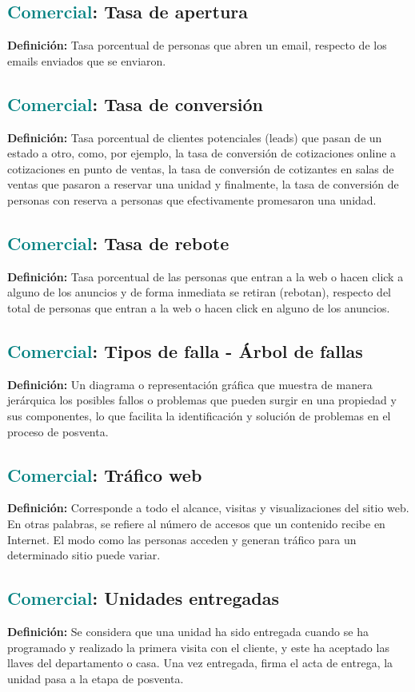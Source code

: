 \documentclass[12pt]{article}
\begin{document}
\subsection{\textcolor{teal}{Comercial}: Tasa de apertura}
\textbf{Definición:} Tasa porcentual de personas que abren un email, respecto de los emails enviados que se enviaron.
\subsection{\textcolor{teal}{Comercial}: Tasa de conversión}
\textbf{Definición:} Tasa porcentual de clientes potenciales (leads) que pasan de un estado a otro, como, por ejemplo, la tasa de conversión de cotizaciones online a cotizaciones en punto de ventas, la tasa de conversión de cotizantes en salas de ventas que pasaron a reservar una unidad y finalmente, la tasa de conversión de personas con reserva a personas que efectivamente promesaron una unidad.
\subsection{\textcolor{teal}{Comercial}: Tasa de rebote}
\textbf{Definición:} Tasa porcentual de las personas que entran a la web o hacen click a alguno de los anuncios y de forma inmediata se retiran (rebotan), respecto del total de personas que entran a la web o hacen click en alguno de los anuncios.
\subsection{\textcolor{teal}{Comercial}: Tipos de falla - Árbol de fallas}
\textbf{Definición:} Un diagrama o representación gráfica que muestra de manera jerárquica los posibles fallos o problemas que pueden surgir en una propiedad y sus componentes, lo que facilita la identificación y solución de problemas en el proceso de posventa.
\subsection{\textcolor{teal}{Comercial}: Tráfico web}
\textbf{Definición:} Corresponde a todo el alcance, visitas y visualizaciones del sitio web. En otras palabras, se refiere al número de accesos que un contenido recibe en Internet. El modo como las personas acceden y generan tráfico para un determinado sitio puede variar.
\subsection{\textcolor{teal}{Comercial}: Unidades entregadas}
\textbf{Definición:} Se considera que una unidad ha sido entregada cuando se ha programado y realizado la primera visita con el cliente, y este ha aceptado las llaves del departamento o casa. Una vez entregada, firma el acta de entrega, la unidad pasa a la etapa de posventa.
\end{document}
